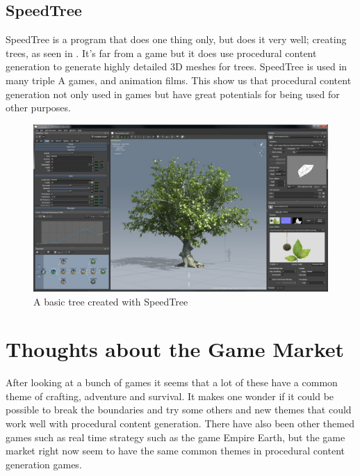\subsection{SpeedTree}

SpeedTree\cite{SpeedTree} is a program that does one thing only, but does it very well; creating trees, as seen in . It's far from a game but it does use procedural content generation to generate highly detailed 3D meshes for trees. SpeedTree is used in many triple A games, and animation films. This show us that procedural content generation not only used in games but have great potentials for being used for other purposes.

\begin{figure}[H]
	\includegraphics[width=0.7\linewidth]{img/SpeedTree}
	\centering
	\caption{A basic tree created with SpeedTree}
	\label{fig:SpeedTree}
\end{figure}


\section{Thoughts about the Game Market}

After looking at a bunch of games it seems that a lot of these have a common theme of crafting, adventure and survival. It makes one wonder if it could be possible to break the boundaries and try some others and new themes that could work well with procedural content generation. There have also been other themed games such as real time strategy such as the game Empire Earth, but the game market right now seem to have the same common themes in procedural content generation games.